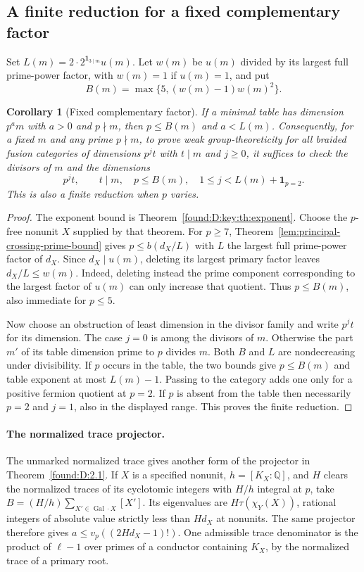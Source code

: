 \documentclass[11pt,a4paper]{article}
\numberwithin{equation}{section}
\newtheorem{corollary}[theorem]{Corollary}
\theoremstyle{remark}
\newcommand{\Gal}{\operatorname{Gal}}
\newcommand{\QQ}{\mathbb Q}
\begin{document}
\subsection{A finite reduction for a fixed complementary factor}\label{found:D:3}\label{found:P:3}\label{found:P:3.1}\label{found:P:key:thm:cofactor}
Set $L(m)=2\cdot 2^{\mathbf1_{3\mid m}}u(m)$. Let $w(m)$ be $u(m)$ divided by its largest full prime-power factor, with $w(m)=1$ if $u(m)=1$, and put
\[
  B(m)=\max\{5,(w(m)-1)w(m)^2\}.
\]
\begin{corollary}[Fixed complementary factor]\label{found:D:cofactor-unified}\label{found:D:3.1}\label{found:D:key:cor:prime}\label{found:P:3.2}\label{found:P:key:cor:promotion}
If a minimal table has dimension $p^a m$ with $a>0$ and $p\nmid m$, then $p\le B(m)$ and $a<L(m)$. Consequently, for a fixed $m$ and any prime $p\nmid m$, to prove weak group-theoreticity for all braided fusion categories of dimensions $p^jt$ with $t\mid m$ and $j\ge0$, it suffices to check the divisors of $m$ and the dimensions
\[
       p^jt,\qquad t\mid m,\quad p\le B(m),\quad
       1\le j<L(m)+\mathbf1_{p=2}.
\]
This is also a finite reduction when $p$ varies.
\end{corollary}
\begin{proof}
The exponent bound is Theorem~\ref{found:D:key:th:exponent}. Choose the $p$-free nonunit $X$ supplied by that theorem.
For $p\ge7$, Theorem~\ref{lem:principal-crossing-prime-bound} gives
$p\le b(d_X/L)$ with $L$ the largest full prime-power factor of $d_X$.
Since $d_X\mid u(m)$, deleting its largest primary factor leaves
$d_X/L\le w(m)$. Indeed, deleting instead the prime component
corresponding to the largest factor of $u(m)$ can only increase that
quotient. Thus $p\le B(m)$, also immediate for $p\le5$.

Now choose an obstruction of least dimension in the divisor family and write $p^jt$ for its dimension. The case $j=0$ is among the divisors of $m$. Otherwise the part $m'$ of its table dimension prime to $p$ divides $m$. Both $B$ and $L$ are nondecreasing under divisibility. If $p$ occurs in the table, the two bounds give $p\le B(m)$ and table exponent at most $L(m)-1$. Passing to the category adds one only for a positive fermion quotient at $p=2$. If $p$ is absent from the table then necessarily $p=2$ and $j=1$, also in the displayed range. This proves the finite reduction.
\end{proof}

\paragraph{The normalized trace projector.} The unmarked normalized trace gives another form of the projector in Theorem~\ref{found:D:2.1}. If $X$ is a specified nonunit, $h=[K_X:\QQ]$, and $H$ clears the normalized traces of its cyclotomic integers with $H/h$ integral at $p$, take $B=(H/h)\sum_{X'\in\Gal\cdot X}[X']$. Its eigenvalues are $H\tau(\chi_Y(X))$, rational integers of absolute value strictly less than $Hd_X$ at nonunits. The same projector therefore gives $a\le v_p((2Hd_X-1)!)$. One admissible trace denominator is the product of $\ell-1$ over primes of a conductor containing $K_X$, by the normalized trace of a primary root.
\end{document}
